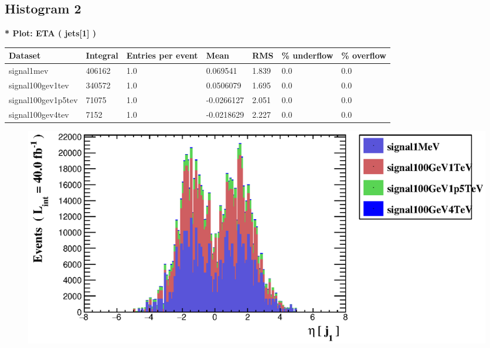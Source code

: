 \documentclass[a4paper, 10pt]{article}
\begin{document}
\subsection{ Histogram 2}

\textbf{* Plot: ETA ( jets[1] ) }\\
   \begin{table}[H]
  \begin{center}
    \begin{tabular}{|m{23.0mm}|m{23.0mm}|m{18.0mm}|m{19.0mm}|m{19.0mm}|m{19.0mm}|m{19.0mm}|}
      \hline
      {\cellcolor{yellow}         Dataset}& {\cellcolor{yellow}         Integral}& {\cellcolor{yellow}         Entries per event}& {\cellcolor{yellow}         Mean}& {\cellcolor{yellow}         RMS}& {\cellcolor{yellow}         \% underflow}& {\cellcolor{yellow}         \% overflow}\\
      \hline
      {\cellcolor{white}         signal1mev}& {\cellcolor{white}         406162}& {\cellcolor{white}         1.0}& {\cellcolor{white}         0.069541}& {\cellcolor{white}         1.839}& {\cellcolor{green}         0.0}& {\cellcolor{green}         0.0}\\
      \hline
      {\cellcolor{white}         signal100gev1tev}& {\cellcolor{white}         340572}& {\cellcolor{white}         1.0}& {\cellcolor{white}         0.0506079}& {\cellcolor{white}         1.695}& {\cellcolor{green}         0.0}& {\cellcolor{green}         0.0}\\
      \hline
      {\cellcolor{white}         signal100gev1p5tev}& {\cellcolor{white}         71075}& {\cellcolor{white}         1.0}& {\cellcolor{white}         -0.0266127}& {\cellcolor{white}         2.051}& {\cellcolor{green}         0.0}& {\cellcolor{green}         0.0}\\
      \hline
      {\cellcolor{white}         signal100gev4tev}& {\cellcolor{white}         7152}& {\cellcolor{white}         1.0}& {\cellcolor{white}         -0.0218629}& {\cellcolor{white}         2.227}& {\cellcolor{green}         0.0}& {\cellcolor{green}         0.0}\\
\hline
    \end{tabular}
  \end{center}
\end{table}

\begin{figure}[H]
  \begin{center}
    \includegraphics[scale=0.45]{selection_1.eps}\\
\caption{   }
  \end{center}
\end{figure}
      \newpage
\end{document}
